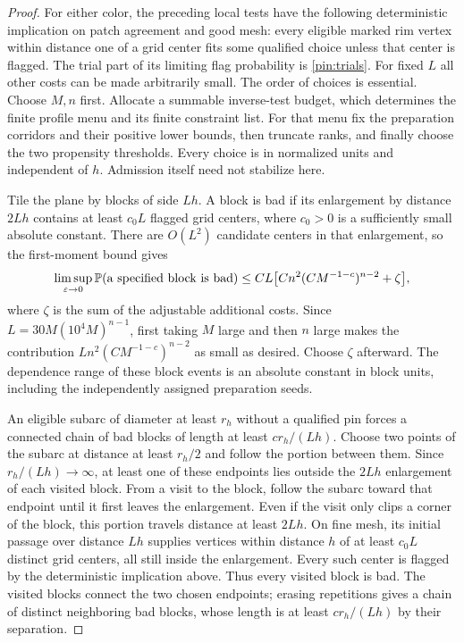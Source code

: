 \begin{proof}
For either color, the preceding local tests have the following
deterministic implication on patch agreement and good mesh: every
eligible marked rim vertex within distance one of a grid center fits
some qualified choice unless that center is flagged.  The trial part
of its limiting flag probability is \eqref{pin:trials}.  For fixed $L$
all other costs can be made arbitrarily small.  The order of choices is
essential.  Choose $M,n$ first.  Allocate a summable inverse-test budget,
which determines the finite profile menu and its finite constraint
list.  For that menu fix the preparation corridors and their positive
lower bounds, then truncate ranks, and finally choose the two
propensity thresholds.  Every choice is in normalized units and
independent of $h$.  Admission itself need not stabilize here.

Tile the plane by blocks of side $Lh$.  A block is bad if its enlargement
by distance $2Lh$ contains at least $c_0L$ flagged grid centers, where
$c_0>0$ is a sufficiently small absolute constant.  There are $O(L^2)$
candidate centers in that enlargement, so the first-moment bound gives
\begin{equation}\label{pin:flag}
 \limsup_{\varepsilon\to0}\mathbb P(\text{a specified block is bad})
 \le CL\bigl[Cn^2(CM^{-1-c})^{n-2}+\zeta\bigr],
\end{equation}
where $\zeta$ is the sum of the adjustable additional costs.  Since
$L=30M(10^4M)^{n-1}$, first taking $M$ large and then $n$ large makes
the contribution $L n^2(CM^{-1-c})^{n-2}$ as small as desired.
Choose $\zeta$ afterward.  The dependence range of these block events
is an absolute constant in block units, including the independently
assigned preparation seeds.

An eligible subarc of diameter at least $r_h$ without a qualified pin
forces a connected chain of bad blocks of length at least
$c r_h/(Lh)$.  Choose two points of the subarc at distance at least
$r_h/2$ and follow the portion between them.  Since $r_h/(Lh)\to\infty$,
at least one of these endpoints lies outside the $2Lh$ enlargement of
each visited block.  From a visit to the block, follow the subarc toward
that endpoint until it first leaves the enlargement.  Even if the visit
only clips a corner of the block, this portion travels distance at least
$2Lh$.  On fine mesh, its initial passage over distance $Lh$ supplies
vertices within distance $h$ of at least $c_0L$ distinct grid centers,
all still inside the enlargement.  Every such center is flagged by the
deterministic implication above.  Thus every visited block is bad.
The visited blocks connect the two chosen endpoints; erasing repetitions
gives a chain of distinct neighboring bad blocks, whose length is at
least $c r_h/(Lh)$ by their separation.


\end{proof}
